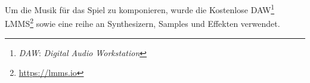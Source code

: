 Um die Musik für das Spiel zu komponieren, wurde
die Kostenlose DAW\footnote{\textit{DAW}: \textit{Digital Audio Workstation}}
LMMS\footnote{\url{https://lmms.io}} sowie eine
reihe an Synthesizern, Samples und Effekten verwendet.

